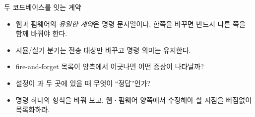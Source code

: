 \begin{teachbox}{두 코드베이스를 잇는 계약}
\begin{itemize}
  \item 웹과 펌웨어의 \emph{유일한 계약}은 명령 문자열이다. 한쪽을 바꾸면 반드시 다른 쪽을 함께 바꿔야 한다.
  \item 시뮬/실기 분기는 전송 대상만 바꾸고 명령 의미는 유지한다.
\end{itemize}
\begin{itemize}
  \item fire-and-forget 목록이 양측에서 어긋나면 어떤 증상이 나타날까?
  \item 설정이 과  두 곳에 있을 때 무엇이 ``정답''인가?
\end{itemize}
\begin{itemize}
  \item 명령 하나의 형식을 바꿔 보고, 웹\textbf{·}펌웨어 양쪽에서 수정해야 할 지점을 빠짐없이 목록화하라.
\end{itemize}
\end{teachbox}

